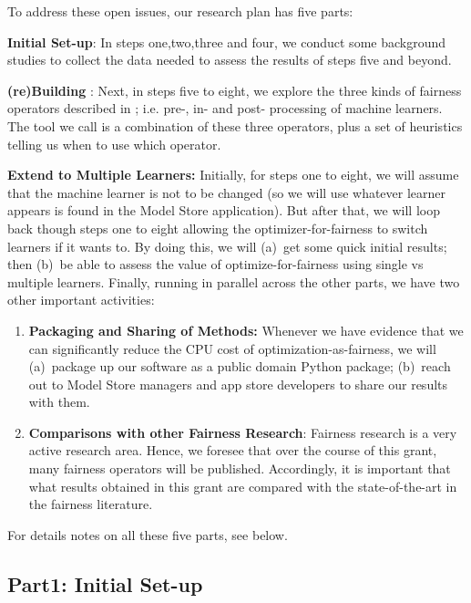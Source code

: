 \noindent
To address these open issues, our research plan  has five parts:
\be
\item
{\bf Initial Set-up}:
In steps
one,two,three and four, we conduct some background studies
to collect the data needed to assess the results of steps five and beyond.
\item
{\bf (re)Building {\IT}}:
Next, in steps five to eight, we explore  the three kinds
of fairness operators described in ; i.e. pre-, in- and post- processing of machine learners. The tool we call {\IT} is a combination
of these three operators, plus a set of heuristics telling us
when to use which operator.
\item
{\bf Extend to Multiple Learners:}
Initially, for steps one to eight, 
we will assume that the machine learner is not
to be changed (so we will use whatever learner appears is found in  the Model Store
application). But after that, we will loop back though steps one to eight
allowing the optimizer-for-fairness to switch learners if it wants
to. By doing this, we will (a)~get some
quick initial results; then
(b)~be able to assess the value of optimize-for-fairness using
single vs multiple learners.
\ei
Finally, running in parallel across the other parts, we have two other important activities:
\begin{enumerate} 
\item
{\bf Packaging and Sharing of Methods:}
Whenever we have evidence that we can significantly reduce
the CPU cost of optimization-as-fairness, we will (a)~package up our software as a public domain Python package; (b)~reach out to Model Store managers and app store developers to share our results with them.
\item
{\bf Comparisons with other Fairness Research}: Fairness research is a very active research area. 
Hence, we foresee that over the course of this grant, many  fairness operators will be published.
Accordingly, it is important that what results obtained in this grant are compared with the state-of-the-art
in the fairness literature. 
\end{enumerate}
For details notes on all these five parts, see below.

 \subsection{Part1: Initial Set-up}
 

